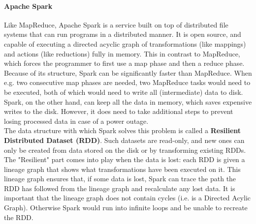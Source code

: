 \paragraph{Apache Spark}
Like MapReduce, Apache Spark is a service built on top of distributed file systems that can run programs in a distributed manner. It is open source, and capable of executing a directed acyclic graph of transformations (like mappings) and actions (like reductions) fully in memory\cite{Sparkwebsite}. This in contrast to MapReduce, which forces the programmer to first use a map phase and then a reduce phase. Because of its structure, Spark can be significantly faster than MapReduce. When e.g. two consecutive map phases are needed, two MapReduce tasks would need to be executed, both of which would need to write all (intermediate) data to disk. Spark, on the other hand, can keep all the data in memory, which saves expensive writes to the disk. However, it does need to take additional steps to prevent losing processed data in case of a power outage.\\

The data structure with which Spark solves this problem is called a \textbf{Resilient Distributed Dataset (RDD)}. Such datasets are read-only, and new ones can only be created from data stored on the disk or by transforming existing RDDs\cite{Zaha12}. The "Resilient" part comes into play when the data is lost: each RDD is given a lineage graph that shows what transformations have been executed on it. This lineage graph ensures that, if some data is lost, Spark can trace the path the RDD has followed from the lineage graph and recalculate any lost data. It is important that the lineage graph does not contain cycles (i.e. is a Directed Acylic Graph). Otherwise Spark would run into infinite loops and be unable to recreate the RDD.
